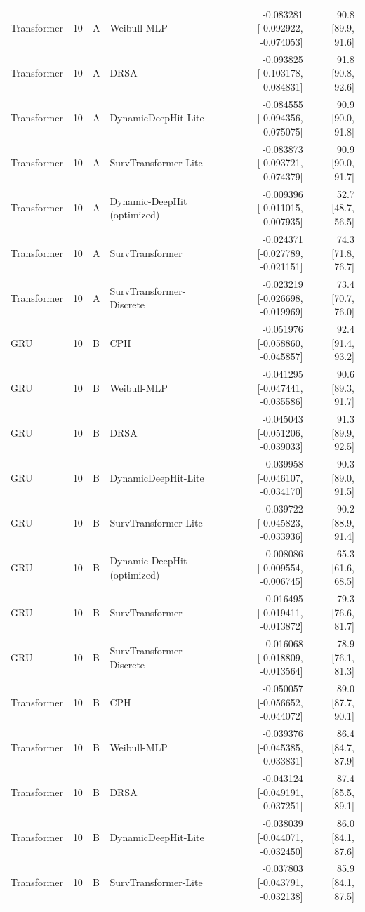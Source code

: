 \begin{longtable}{lll p{3.0cm} rr}
Transformer & 10 & A & Weibull-MLP & -0.083281 [-0.092922, -0.074053] & 90.8 [89.9, 91.6]\\
Transformer & 10 & A & DRSA & -0.093825 [-0.103178, -0.084831] & 91.8 [90.8, 92.6]\\
Transformer & 10 & A & DynamicDeepHit-Lite & -0.084555 [-0.094356, -0.075075] & 90.9 [90.0, 91.8]\\
Transformer & 10 & A & SurvTransformer-Lite & -0.083873 [-0.093721, -0.074379] & 90.9 [90.0, 91.7]\\
Transformer & 10 & A & Dynamic-DeepHit (optimized) & -0.009396 [-0.011015, -0.007935] & 52.7 [48.7, 56.5]\\
Transformer & 10 & A & SurvTransformer & -0.024371 [-0.027789, -0.021151] & 74.3 [71.8, 76.7]\\
Transformer & 10 & A & SurvTransformer-Discrete & -0.023219 [-0.026698, -0.019969] & 73.4 [70.7, 76.0]\\
GRU & 10 & B & CPH & -0.051976 [-0.058860, -0.045857] & 92.4 [91.4, 93.2]\\
GRU & 10 & B & Weibull-MLP & -0.041295 [-0.047441, -0.035586] & 90.6 [89.3, 91.7]\\
GRU & 10 & B & DRSA & -0.045043 [-0.051206, -0.039033] & 91.3 [89.9, 92.5]\\
GRU & 10 & B & DynamicDeepHit-Lite & -0.039958 [-0.046107, -0.034170] & 90.3 [89.0, 91.5]\\
GRU & 10 & B & SurvTransformer-Lite & -0.039722 [-0.045823, -0.033936] & 90.2 [88.9, 91.4]\\
GRU & 10 & B & Dynamic-DeepHit (optimized) & -0.008086 [-0.009554, -0.006745] & 65.3 [61.6, 68.5]\\
GRU & 10 & B & SurvTransformer & -0.016495 [-0.019411, -0.013872] & 79.3 [76.6, 81.7]\\
GRU & 10 & B & SurvTransformer-Discrete & -0.016068 [-0.018809, -0.013564] & 78.9 [76.1, 81.3]\\
Transformer & 10 & B & CPH & -0.050057 [-0.056652, -0.044072] & 89.0 [87.7, 90.1]\\
Transformer & 10 & B & Weibull-MLP & -0.039376 [-0.045385, -0.033831] & 86.4 [84.7, 87.9]\\
Transformer & 10 & B & DRSA & -0.043124 [-0.049191, -0.037251] & 87.4 [85.5, 89.1]\\
Transformer & 10 & B & DynamicDeepHit-Lite & -0.038039 [-0.044071, -0.032450] & 86.0 [84.1, 87.6]\\
Transformer & 10 & B & SurvTransformer-Lite & -0.037803 [-0.043791, -0.032138] & 85.9 [84.1, 87.5]\\

\end{longtable}
